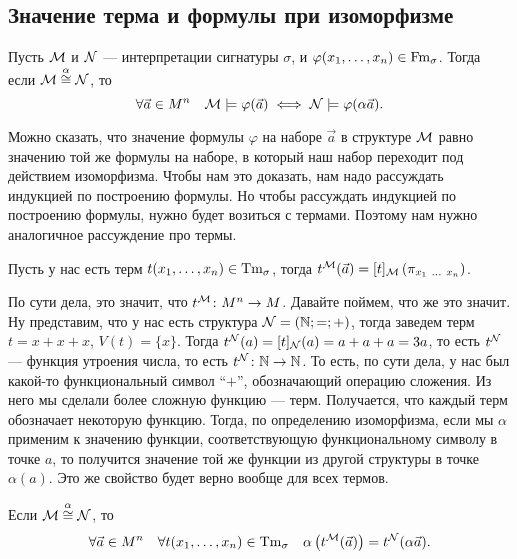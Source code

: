 \subsection{Значение терма и формулы при изоморфизме}

\begin{theorem}
    Пусть $\mathcal{M}$ и $\mathcal{N}$ --- интерпретации сигнатуры $\sigma$, и $\varphi(x_{1}, \ldots, x_{n}) \in \mathrm{Fm}_{\sigma}$.
    Тогда если $\mathcal{M} \overset{\alpha}{\cong} \mathcal{N}$, то
    $$
        \forall \vec{a} \in M^{n} \quad \mathcal{M} \models \varphi(\vec{a}) \iff \mathcal{N} \models \varphi(\alpha \vec{a}).
    $$
\end{theorem}

Можно сказать, что значение формулы $\varphi$ на наборе $\vec{a}$ в структуре $\mathcal{M}$ равно значению той же формулы на наборе, в который наш набор переходит под действием изоморфизма.
Чтобы нам это доказать, нам надо рассуждать индукцией по построению формулы.
Но чтобы рассуждать индукцией по построению формулы, нужно будет возиться с термами.
Поэтому нам нужно аналогичное рассуждение про термы.

\begin{definition}
    Пусть у нас есть терм $t(x_{1}, \ldots, x_{n}) \in \mathrm{Tm}_{\sigma}$,
    тогда $t^{\mathcal{M}}(\vec{a}) = [t]_{\mathcal{M}}\left( \pi_{x_{1}~\ldots~x_{n}} \right)$.
\end{definition}

По сути дела, это значит, что $t^{\mathcal{M}} \colon M^{n} \to M$.
Давайте поймем, что же это значит.
Ну представим, что у нас есть структура $\mathcal{N} = (\mathbb{N}; =; +)$, тогда заведем терм $t = x + x + x$, $V(t) = \{x\}$.
Тогда $t^{\mathcal{N}}(a) = [t]_{\mathcal{N}}(a) = a + a + a = 3a$, то есть $t^{\mathcal{N}}$ --- функция утроения числа, то есть $t^{\mathcal{N}} \colon \mathbb{N} \to \mathbb{N}$.
То есть, по сути дела, у нас был какой-то функциональный символ \enquote{$+$}, обозначающий операцию сложения.
Из него мы сделали более сложную функцию --- терм.
Получается, что каждый терм обозначает некоторую функцию.
Тогда, по определению изоморфизма, если мы $\alpha$ применим к значению функции, соответствующую функциональному символу в точке $a$, то получится значение той же функции из другой структуры в точке $\alpha(a)$.
Это же свойство будет верно вообще для всех термов.

\begin{lemma} \label{lem::term-isomorphism}
    Если $\mathcal{M} \overset{\alpha}{\cong} \mathcal{N}$, то
    $$
    \forall \vec{a} \in M^{n} \quad \forall t(x_{1}, \ldots, x_{n}) \in \mathrm{Tm}_{\sigma} \quad \alpha\left(t^{\mathcal{M}}(\vec{a})\right) = t^{\mathcal{N}}(\alpha\vec{a}).
    $$
\end{lemma}

